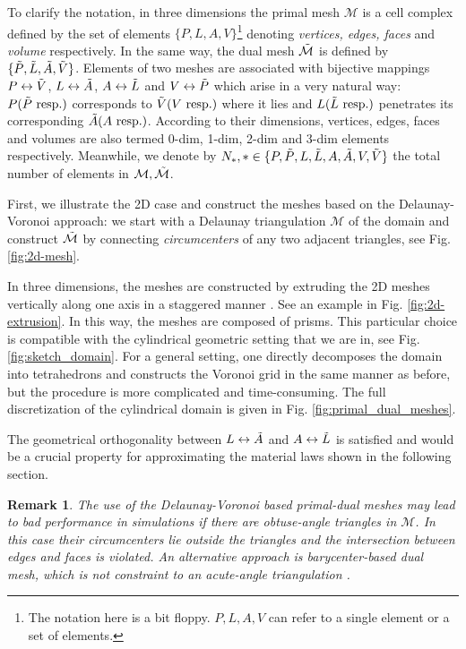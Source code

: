 \documentclass{article}
\newtheorem*{remark}{Remark}
\begin{document}
To clarify the notation, in three dimensions the primal mesh $\mathcal{M}$ is a cell complex defined by the set of elements $\{P, L, A, V\}$\footnote{The notation here is a bit floppy. $P, L, A, V$ can refer to a single element or a set of elements.} denoting \emph{vertices, edges, faces} and \emph{volume} respectively. In the same way, the dual mesh $\Tilde{\mathcal{M}}$ is defined by $\{\Tilde{P}, \Tilde{L}, \Tilde{A}, \Tilde{V}\}$. Elements of two meshes are associated with bijective mappings $P \leftrightarrow \Tilde{V}$, $L \leftrightarrow \Tilde{A}$, $A \leftrightarrow \Tilde{L}$ and $V \leftrightarrow \Tilde{P}$ which arise in a very natural way: $P(\Tilde{P} \text{ resp.})$ corresponds to $\Tilde{V}(V \text{ resp.})$ where it lies and $L(\Tilde{L} \text{ resp.})$ penetrates its corresponding $\Tilde{A}(A \text{ resp.})$. According to their dimensions, vertices, edges, faces and volumes are also termed 0-dim, 1-dim, 2-dim and 3-dim elements respectively. Meanwhile, we denote by $N_\ast, \ast \in \{P, \Tilde{P}, L, \Tilde{L},A, \Tilde{A},V, \Tilde{V}\}$ the total number of elements in $\mathcal{M}, \Tilde{\mathcal{M}}$. 

First, we illustrate the 2D case and construct the meshes based on the Delaunay-Voronoi approach: we start with a Delaunay triangulation $\mathcal{M}$ of the domain and construct $\Tilde{\mathcal{M}}$ by connecting \emph{circumcenters} of any two adjacent triangles, see Fig. \ref{fig:2d-mesh}.

In three dimensions, the meshes are constructed by extruding the 2D meshes vertically along one axis in a staggered manner \cite{Marrone_2001}. See an example in Fig. \ref{fig:2d-extrusion}. In this way, the meshes are composed of prisms. This particular choice is compatible with the cylindrical geometric setting that we are in, see Fig. \ref{fig:sketch_domain}. For a general setting, one directly decomposes the domain into tetrahedrons and constructs the Voronoi grid in the same manner as before, but the procedure is more complicated and time-consuming. The full discretization of the cylindrical domain is given in Fig. \ref{fig:primal_dual_meshes}. 

The geometrical orthogonality between $L \leftrightarrow \Tilde{A}$ and $A \leftrightarrow \Tilde{L}$ is satisfied and would be a crucial property for approximating the material laws shown in the following section. 

\begin{remark}
    The use of the Delaunay-Voronoi based primal-dual meshes may lead to bad performance in simulations if there are obtuse-angle triangles in $\mathcal{M}$. In this case their circumcenters lie outside the triangles and the intersection between edges and faces is violated. An alternative approach is barycenter-based dual mesh, which is not constraint to an acute-angle triangulation \cite{Marrone_2001}. 
\end{remark}
\end{document}
